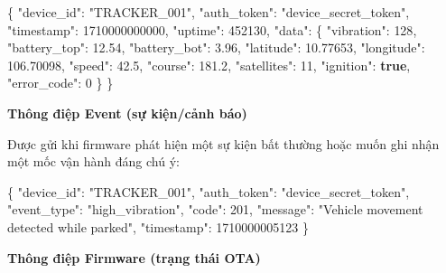 \documentclass[13pt,a4paper]{extarticle}
\newenvironment{Shaded}{}{}
\newcommand{\DataTypeTok}[1]{\textcolor[rgb]{0.56,0.13,0.00}{#1}}
\newcommand{\DecValTok}[1]{\textcolor[rgb]{0.25,0.63,0.44}{#1}}
\newcommand{\FloatTok}[1]{\textcolor[rgb]{0.25,0.63,0.44}{#1}}
\newcommand{\FunctionTok}[1]{\textcolor[rgb]{0.02,0.16,0.49}{#1}}
\newcommand{\KeywordTok}[1]{\textcolor[rgb]{0.00,0.44,0.13}{\textbf{#1}}}
\newcommand{\StringTok}[1]{\textcolor[rgb]{0.25,0.44,0.63}{#1}}
\renewcommand{\\}{\thesislongtableorignewline\hline}%
\begin{document}
\begin{Shaded}
\begin{Highlighting}[]
\FunctionTok{\{}
  \DataTypeTok{"device\_id"}\FunctionTok{:} \StringTok{"TRACKER\_001"}\FunctionTok{,}
  \DataTypeTok{"auth\_token"}\FunctionTok{:} \StringTok{"device\_secret\_token"}\FunctionTok{,}
  \DataTypeTok{"timestamp"}\FunctionTok{:} \DecValTok{1710000000000}\FunctionTok{,}
  \DataTypeTok{"uptime"}\FunctionTok{:} \DecValTok{452130}\FunctionTok{,}
  \DataTypeTok{"data"}\FunctionTok{:} \FunctionTok{\{}
    \DataTypeTok{"vibration"}\FunctionTok{:} \DecValTok{128}\FunctionTok{,}
    \DataTypeTok{"battery\_top"}\FunctionTok{:} \FloatTok{12.54}\FunctionTok{,}
    \DataTypeTok{"battery\_bot"}\FunctionTok{:} \FloatTok{3.96}\FunctionTok{,}
    \DataTypeTok{"latitude"}\FunctionTok{:} \FloatTok{10.77653}\FunctionTok{,}
    \DataTypeTok{"longitude"}\FunctionTok{:} \FloatTok{106.70098}\FunctionTok{,}
    \DataTypeTok{"speed"}\FunctionTok{:} \FloatTok{42.5}\FunctionTok{,}
    \DataTypeTok{"course"}\FunctionTok{:} \FloatTok{181.2}\FunctionTok{,}
    \DataTypeTok{"satellites"}\FunctionTok{:} \DecValTok{11}\FunctionTok{,}
    \DataTypeTok{"ignition"}\FunctionTok{:} \KeywordTok{true}\FunctionTok{,}
    \DataTypeTok{"error\_code"}\FunctionTok{:} \DecValTok{0}
  \FunctionTok{\}}
\FunctionTok{\}}
\end{Highlighting}
\end{Shaded}

\textbf{Thông điệp Event (sự kiện/cảnh báo)}

Được gửi khi firmware phát hiện một sự kiện bất thường hoặc muốn ghi
nhận một mốc vận hành đáng chú ý:

\begin{Shaded}
\begin{Highlighting}[]
\FunctionTok{\{}
  \DataTypeTok{"device\_id"}\FunctionTok{:} \StringTok{"TRACKER\_001"}\FunctionTok{,}
  \DataTypeTok{"auth\_token"}\FunctionTok{:} \StringTok{"device\_secret\_token"}\FunctionTok{,}
  \DataTypeTok{"event\_type"}\FunctionTok{:} \StringTok{"high\_vibration"}\FunctionTok{,}
  \DataTypeTok{"code"}\FunctionTok{:} \DecValTok{201}\FunctionTok{,}
  \DataTypeTok{"message"}\FunctionTok{:} \StringTok{"Vehicle movement detected while parked"}\FunctionTok{,}
  \DataTypeTok{"timestamp"}\FunctionTok{:} \DecValTok{1710000005123}
\FunctionTok{\}}
\end{Highlighting}
\end{Shaded}

\textbf{Thông điệp Firmware (trạng thái OTA)}
\end{document}
